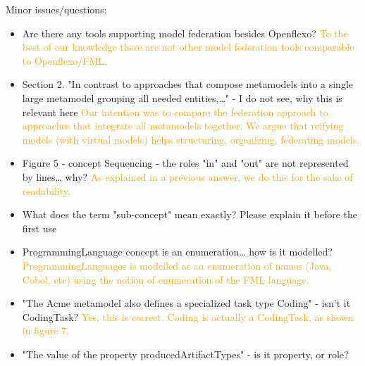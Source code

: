 \documentclass[10pt]{article}
\begin{document}
\begin{response}{Minor issues/questions:
\begin{itemize}
    \item Are there any tools supporting model federation besides Openflexo? \textcolor{orange}{To the best of our knowledge there are not other model federation tools comparable to Openflexo/FML.}
    \item Section 2. "In contrast to approaches that compose metamodels into a single large metamodel grouping all needed entities,…" - I do not see, why this is relevant here \textcolor{orange}{Our intention was to compare the federation approach to approaches that integrate all metamodels together. We argue that reifying models (with virtual models) helps structuring, organizing, federating models.}
    \item Figure 5 - concept Sequencing - the roles "in" and "out" are not represented by lines… why? \textcolor{orange}{As explained in a previous answer, we do this for the sake of readability.}
    \item What does the term "sub-concept" mean exactly? Please explain it before the first use 
    \item ProgrammingLanguage concept is an enumeration… how is it modelled? \textcolor{orange}{ProgrammingLanguages is modelled as an enumeration of names (Java, Cobol, etc) using the notion of enumeration of the FML language. }
    \item "The Acme metamodel also defines a specialized task type Coding" - isn’t it CodingTask? \textcolor{orange}{Yes, this is correct. Coding is actually a CodingTask, as shown in figure 7.}
    \item "The value of the property producedArtifactTypes" - is it property, or role? 
\end{itemize}}







\end{response}
\end{document}

